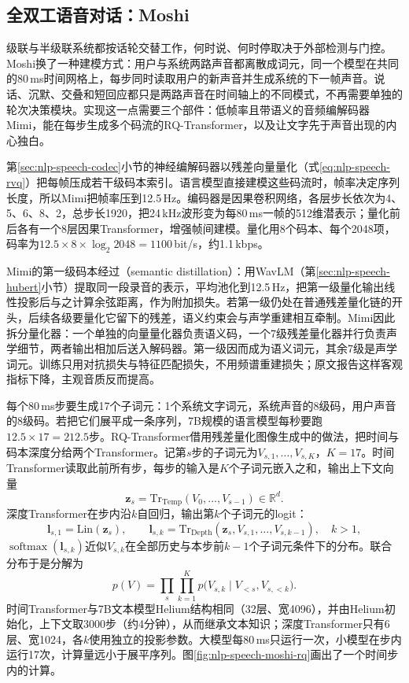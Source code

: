 \subsection{全双工语音对话：Moshi}
\label{sec:nlp-speech-moshi}

级联与半级联系统都按话轮交替工作，何时说、何时停取决于外部检测与门控。Moshi换了一种建模方式：用户与系统两路声音都离散成词元，同一个模型在共同的80\,ms时间网格上，每步同时读取用户的新声音并生成系统的下一帧声音。说话、沉默、交叠和短回应都只是两路声音在时间轴上的不同模式，不再需要单独的轮次决策模块。实现这一点需要三个部件：低帧率且带语义的音频编解码器Mimi，能在每步生成多个码流的RQ-Transformer，以及让文字先于声音出现的内心独白。

第\ref{sec:nlp-speech-codec}小节的神经编解码器以残差向量量化（式\eqref{eq:nlp-speech-rvq}）把每帧压成若干级码本索引。语言模型直接建模这些码流时，帧率决定序列长度，所以Mimi把帧率压到12.5\,Hz。编码器是因果卷积网络，各层步长依次为4、5、6、8、2，总步长1920，把24\,kHz波形变为每80\,ms一帧的512维潜表示；量化前后各有一个8层因果Transformer，增强帧间建模。量化用8个码本、每个2048项，码率为$12.5\times8\times\log_2 2048=1100$\,bit/s，约1.1\,kbps。

Mimi的第一级码本经过（semantic distillation）：用WavLM（第\ref{sec:nlp-speech-hubert}小节）提取同一段录音的表示，平均池化到12.5\,Hz，把第一级量化输出线性投影后与之计算余弦距离，作为附加损失。若第一级仍处在普通残差量化链的开头，后续各级要量化它留下的残差，语义约束会与声学重建相互牵制。Mimi因此拆分量化器：一个单独的向量量化器负责语义码，一个7级残差量化器并行负责声学细节，两者输出相加后送入解码器。第一级因而成为语义词元，其余7级是声学词元。训练只用对抗损失与特征匹配损失，不用频谱重建损失；原文报告这样客观指标下降，主观音质反而提高。

每个80\,ms步要生成17个子词元：1个系统文字词元，系统声音的8级码，用户声音的8级码。若把它们展平成一条序列，7B规模的语言模型每秒要跑$12.5\times17=212.5$步。RQ-Transformer借用残差量化图像生成中的做法，把时间与码本深度分给两个Transformer\cite{nlp-speech-lee2022rqtransformer}。记第$s$步的子词元为$V_{s,1},\ldots,V_{s,K}$，$K=17$。时间Transformer读取此前所有步，每步的输入是$K$个子词元嵌入之和，输出上下文向量
\begin{equation}
 \bm z_s=\mathrm{Tr}_{\mathrm{Temp}}(V_0,\ldots,V_{s-1})\in\mathbb R^{d}.
 \label{eq:nlp-speech-rq-temporal}
\end{equation}
深度Transformer在步内沿$k$自回归，输出第$k$个子词元的logit：
\[
 \bm l_{s,1}=\mathrm{Lin}(\bm z_s),\qquad
 \bm l_{s,k}=\mathrm{Tr}_{\mathrm{Depth}}(\bm z_s,V_{s,1},\ldots,V_{s,k-1}),\quad k>1,
\]
$\operatorname{softmax}(\bm l_{s,k})$近似$V_{s,k}$在全部历史与本步前$k-1$个子词元条件下的分布。联合分布于是分解为
\begin{equation}
 p(V)=\prod_{s}\prod_{k=1}^{K}p\bigl(V_{s,k}\mid V_{<s},V_{s,<k}\bigr).
 \label{eq:nlp-speech-rq-factorization}
\end{equation}
时间Transformer与7B文本模型Helium结构相同（32层、宽4096），并由Helium初始化，上下文取3000步（约4分钟），从而继承文本知识；深度Transformer只有6层、宽1024，各$k$使用独立的投影参数。大模型每80\,ms只运行一次，小模型在步内运行17次，计算量远小于展平序列。图\ref{fig:nlp-speech-moshi-rq}画出了一个时间步内的计算。

